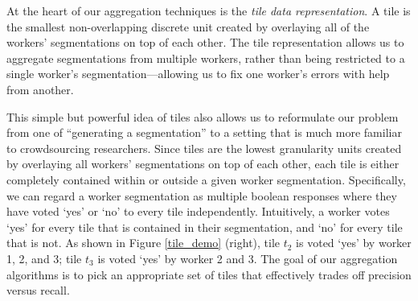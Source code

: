 At the heart of our aggregation techniques is the \emph{tile data representation}. A tile is the smallest non-overlapping discrete unit created by overlaying all of the workers' segmentations on top of each other. %
The tile representation allows us to aggregate segmentations from multiple workers, rather than being restricted to a single worker's segmentation---allowing us to fix one worker's errors with help from another. 
\par This simple but powerful idea of tiles also allows us to reformulate our problem from one of ``generating a segmentation'' to a setting that is much more familiar to crowdsourcing researchers. Since tiles are the lowest granularity units created by overlaying all workers' segmentations on top of each other, each tile is either completely contained within or outside a given worker segmentation. Specifically, we can regard a worker segmentation as multiple boolean responses where they have voted `yes' or `no' to every tile independently. Intuitively, a worker votes `yes' for every tile that is contained in their segmentation, and `no' for every tile that is not. As shown in Figure \ref{tile_demo} (right), tile $t_2$ is voted `yes' by worker 1, 2, and 3; tile $t_3$ is voted `yes' by worker 2 and 3. The goal of our aggregation algorithms is to pick an appropriate set of tiles that effectively trades off precision versus recall.
